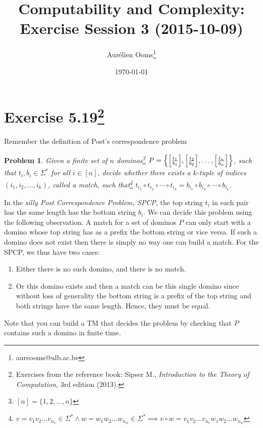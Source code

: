 \documentclass{article}
\title{Computability and Complexity:\\Exercise Session 3 (2015-10-09)}
\author{Aurélien Ooms\footnote{aureooms@ulb.ac.be}}
\date{\today}
\newcommand{\problemname}{Problem}
\newtheorem{problem}{\problemname}
\begin{document}
\maketitle
\tableofcontents

\section{Exercise 5.19\footnote{Exercises from the reference book: Sipser M.,
\emph{Introduction to the Theory of Computation}, 3rd edition (2013).}}

Remember the definition of Post's correspondence problem
\begin{problem}\label{PCP}
	Given a finite set of \(n\) dominos\footnote{\([n] = \{1,2,\ldots,n\}\)}
	\(P = \mleft\{ \mleft[\frac{t_1}{b_1}\mright] , \mleft[\frac{t_2}{b_2}\mright] , \ldots
			, \mleft[\frac{t_n}{b_n}\mright]\mright\}\), such that \(t_i, b_i
		\in \Sigma^*\)
			for all \(i \in [n]\), decide
	whether there exists a \(k\)-tuple of indices \((i_1,i_2,\ldots,i_k)\),
	called a match,
	such that\footnote{\(v = v_1 v_2 \ldots v_{n_v} \in \Sigma^* \land w = w_1 w_2 \ldots
			w_{n_w} \in \Sigma^* \implies v \circ w = v_1 v_2 \ldots v_{n_v} w_1 w_2
	\ldots w_{n_w}\) }
	\(t_{i_1} \circ t_{i_2} \circ \cdots \circ t_{i_k} =
	b_{i_1} \circ b_{i_2} \circ \cdots \circ b_{i_k} \).
\end{problem}

In the \emph{silly Post Correspondence Problem, SPCP}, the top string \(t_i\)
in each pair has the same length has the bottom string \(b_i\). We can decide
this problem using the following observation.
A match for a set of dominos \(P\) can only start with a domino whose top
string has as a prefix the bottom string or vice versa. If such a domino does
not exist then there is simply no way one can build a match.
For the SPCP, we thus have two cases:
\begin{enumerate}
	\item Either there is no such domino, and there is no match.
	\item Or this domino exists and then a match can be this single domino
		since without loss of generality the bottom string is a prefix of the
		top string and both strings have the same length. Hence, they must be
		equal.
\end{enumerate}
Note that you can build a TM that decides the problem by checking that \(P\)
contains such a domino in finite time.
\end{document}
